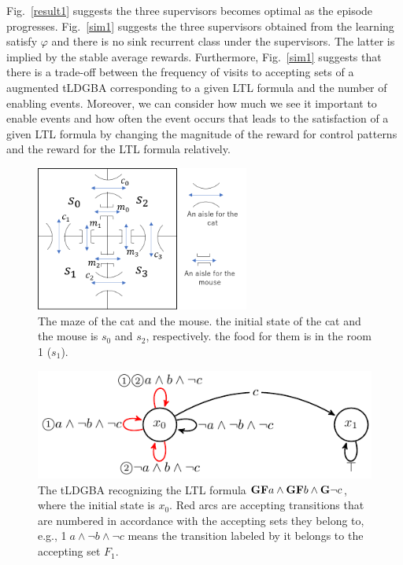\documentclass[10 pt, dvipdfmx]{article}
\theoremstyle{definition}
\begin{document}
Fig.\ \ref{result1} suggests the three supervisors becomes optimal as the episode progresses.
Fig.\ \ref{sim1} suggests the three supervisors obtained from the learning satisfy $\varphi$ and there is no sink recurrent class under the supervisors. The latter is implied by the stable average rewards.
Furthermore, Fig.\ \ref{sim1} suggests that there is a trade-off between the frequency of visits to accepting sets of a augmented tLDGBA corresponding to a given LTL formula and the number of enabling events. Moreover, we can consider how much we see it important to enable events and how often the event occurs that leads to the satisfaction of a given LTL formula by changing the magnitude of the reward for control patterns and the reward for the LTL formula relatively.

\begin{figure}[htbp]
   \centering
   \vspace{2mm}
   \includegraphics[width=7cm]{cat_mouse.png}
   \caption{The maze of the cat and the mouse. the initial state of the cat and the mouse is $s_0$ and $s_2$, respectively. the food for them is in the room 1 ($s_1$).}
   \label{cat_mouse}
\end{figure}

\begin{figure}[htbp]
   \centering
   \vspace{2mm}
   \includegraphics[bb=0 0 247 80,scale=0.85]{ldgba_original.pdf}
   \caption{The tLDGBA recognizing the LTL formula $\text{{\bf GF}}a \wedge \text{{\bf GF}}b \wedge \text{{\bf G}}\neg c$, where the initial state is $x_0$. Red arcs are accepting transitions that are numbered in accordance with the accepting sets they belong to, e.g., \textcircled{\scriptsize 1}$a \land \neg b \land \neg c$ means the transition labeled by it belongs to the accepting set $F_1$.}
   \label{tldba}
\end{figure}
\end{document}
